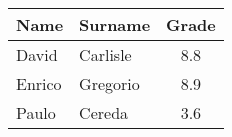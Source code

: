 \documentclass{article}
\begin{document}
\begin{tabular}{llS}
	\hline
	Name   & Surname  & {Grade} \\
	\hline
	David  & Carlisle & 8.8     \\
	Enrico & Gregorio & 8.9     \\
	Paulo  & Cereda   & 3.6     \\
	\hline
\end{tabular}
\end{document}
